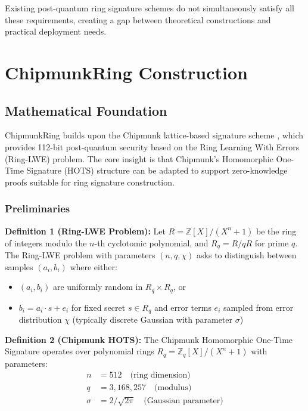 \documentclass[11pt,a4paper]{article}
\begin{document}
Existing post-quantum ring signature schemes do not simultaneously satisfy all these requirements, creating a gap between theoretical constructions and practical deployment needs.

\section{ChipmunkRing Construction}

\subsection{Mathematical Foundation}

ChipmunkRing builds upon the Chipmunk lattice-based signature scheme \cite{chipmunk}, which provides 112-bit post-quantum security based on the Ring Learning With Errors (Ring-LWE) problem. The core insight is that Chipmunk's Homomorphic One-Time Signature (HOTS) structure can be adapted to support zero-knowledge proofs suitable for ring signature construction.

\subsubsection{Preliminaries}

\textbf{Definition 1 (Ring-LWE Problem):} Let $R = \mathbb{Z}[X]/(X^n + 1)$ be the ring of integers modulo the $n$-th cyclotomic polynomial, and $R_q = R/qR$ for prime $q$. The Ring-LWE problem with parameters $(n, q, \chi)$ asks to distinguish between samples $(a_i, b_i)$ where either:
\begin{itemize}
\item $(a_i, b_i)$ are uniformly random in $R_q \times R_q$, or  
\item $b_i = a_i \cdot s + e_i$ for fixed secret $s \in R_q$ and error terms $e_i$ sampled from error distribution $\chi$ (typically discrete Gaussian with parameter $\sigma$)
\end{itemize}

\textbf{Definition 2 (Chipmunk HOTS):} The Chipmunk Homomorphic One-Time Signature operates over polynomial rings $R_q = \mathbb{Z}_q[X]/(X^n + 1)$ with parameters:
\begin{align}
n &= 512 \quad \text{(ring dimension)} \\
q &= 3,168,257 \quad \text{(modulus)} \\
\sigma &= 2/\sqrt{2\pi} \quad \text{(Gaussian parameter)}
\end{align}
\end{document}
